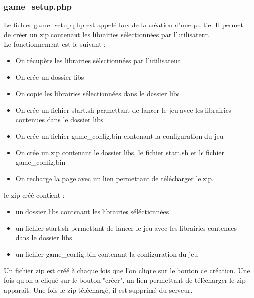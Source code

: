 \documentclass[12pt, openany]{article}
\begin{document}
	\subsubsection{game\_setup.php}
	Le fichier game\_setup.php est appelé lors de la création d'une partie. Il permet de créer un zip contenant les librairies sélectionnées par l'utilisateur.\\
	Le fonctionnement est le suivant :\\
	\begin{itemize}[label=$-$]
		\item On récupère les librairies sélectionnées par l'utilisateur\\
		\item On crée un dossier libs\\
		\item On copie les librairies sélectionnées dans le dossier libs\\
		\item On crée un fichier start.sh permettant de lancer le jeu avec les librairies contenues dans le dossier libs\\
		\item On crée un fichier game\_config.bin contenant la configuration du jeu\\
		\item On crée un zip contenant le dossier libs, le fichier start.sh et le fichier game\_config.bin\\
		\item On recharge la page avec un lien permettant de télécharger le zip.\\
	\end{itemize}

	le zip créé contient :
	\begin{itemize}[label=$-$]
		\item un dossier libs contenant les librairies séléctionnées\\
		\item un fichier start.sh permettant de lancer le jeu avec les librairies contenues dans le dossier libs\\
		\item un fichier game\_config.bin contenant la configuration du jeu\\
	\end{itemize}
	Un fichier zip est créé à chaque fois que l'on clique sur le bouton de création. Une fois qu'on a cliqué sur le bouton "créer", un lien permettant de télécharger le zip apparaît. Une fois le zip téléchargé, il est supprimé du serveur.\\
\end{document}
